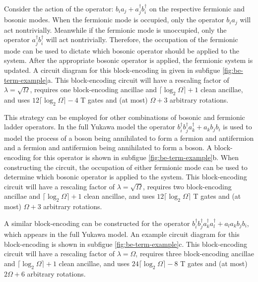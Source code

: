 \begin{figure*}
    
    
    
    \caption{
        \textbf{Block-Encoding Terms}
        In (a), a block-encoding for the operator $b_i^\dagger a_j^\dagger + a_j b_i$ is given.
        In (b), a block-encoding for the operator $ b_i^\dagger b_j^\dagger a_k^\dagger + a_k b_j b_i$ is given.
        In (c), a block-encoding for the operator $b_i^\dagger b_j^\dagger a_k^\dagger a_l^\dagger + a_l a_k b_j b_i$ is given.
    }
    \label{fig:be-term-example}
\end{figure*}


Consider the action of the operator: $b_i a_j + a_j^\dagger b_i^\dagger$ on the respective fermionic and bosonic modes.
When the fermionic mode is occupied, only the operator $b_i a_j$ will act nontrivially.
Meanwhile if the fermionic mode is unoccupied, only the operator $a_j^\dagger b_i^\dagger$ will act nontrivially.
Therefore, the occupation of the fermionic mode can be used to dictate which bosonic operator should be applied to the system.
After the appropriate bosonic operator is applied, the fermionic system is updated.
A circuit diagram for this block-encoding in given in subfigue \ref{fig:be-term-example}a.
This block-encoding circuit will have a rescaling factor of $\lambda = \sqrt{\Omega}$, requires one block-encoding ancillae and $\lceil \log_2\Omega \rceil + 1$ clean ancillae, and uses  $12 \lceil \log_2 \Omega \rceil - 4$ T gates and (at most) $\Omega + 3$ arbitrary rotations.

This strategy can be employed for other combinations of bosonic and fermionic ladder operators.
In the full Yukawa model the operator $b_i^\dagger b_j^\dagger a_k^\dagger + a_k b_j b_i$ is used to model the process of a boson being annihilated to form a fermion and antifermion and a fermion and antifermion being annihilated to form a boson.
A block-encoding for this operator is shown in subfigue \ref{fig:be-term-example}b.
When constructing the circuit, the occupation of either fermionic mode can be used to determine which bosonic operator is applied to the system.
This block-encoding circuit will have a rescaling factor of $\lambda = \sqrt{\Omega}$, requires two block-encoding ancillae and $\lceil \log_2\Omega \rceil + 1$ clean ancillae, and uses  $12 \lceil \log_2 \Omega \rceil$ T gates and (at most) $\Omega + 3$ arbitrary rotations.

A similar block-encoding can be constructed for the operator $b_i^\dagger b_j^\dagger a_k^\dagger a_l^\dagger + a_l a_k b_j b_i$, which appears in the full Yukawa model.
An example circuit diagram for this block-encoding is shown in subfigue \ref{fig:be-term-example}c.
This block-encoding circuit will have a rescaling factor of $\lambda = \Omega$, requires three block-encoding ancillae and $\lceil \log_2\Omega \rceil + 1$ clean ancillae, and uses  $24 \lceil \log_2\Omega \rceil - 8$ T gates and (at most) $2\Omega + 6$ arbitrary rotations.

